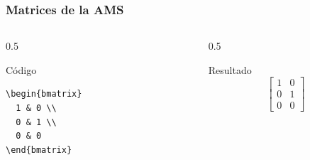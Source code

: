 \documentclass[12pt,aspectratio=169,ignorenonframetext]{ltxbeamer}
\begin{document}
\begin{frame}[fragile]
\frametitle{Matrices de la AMS}

\begin{columns}
    \begin{column}{0.5\textwidth}
        \begin{block}{Código}
\begin{verbatim}
\begin{bmatrix}
  1 & 0 \\
  0 & 1 \\
  0 & 0
\end{bmatrix}
\end{verbatim}
        \end{block}
    \end{column}

    \begin{column}{0.5\textwidth}
        \begin{exampleblock}{Resultado}
            \begin{equation*}
                \begin{bmatrix}
                    1 & 0 \\
                    0 & 1 \\
                    0 & 0
                \end{bmatrix}
            \end{equation*}
        \end{exampleblock}
    \end{column}
\end{columns}
\end{frame}
\end{document}
